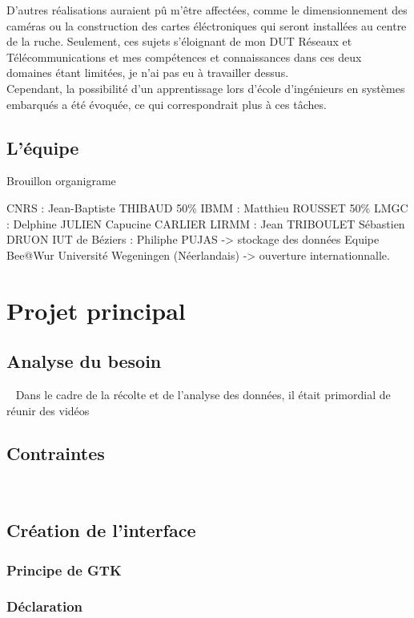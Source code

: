 \documentclass[11pt, french]{report}
\begin{document}
D'autres réalisations auraient pû m'être affectées, comme le dimensionnement des caméras ou la construction des cartes éléctroniques
qui seront installées au centre de la ruche. Seulement, ces sujets s'éloignant de mon DUT Réseaux et Télécommunications et mes 
compétences et connaissances dans ces deux domaines étant limitées, je n'ai pas eu à travailler dessus.\\
Cependant, la possibilité d'un apprentissage lors d'école d'ingénieurs en systèmes embarqués a été évoquée, ce qui correspondrait 
plus à ces tâches.\\


\subsection{L'équipe}

Brouillon organigrame 

CNRS : Jean-Baptiste THIBAUD 50\%
IBMM : Matthieu ROUSSET 50\%
LMGC : Delphine JULIEN
       Capucine CARLIER
LIRMM : Jean TRIBOULET 
        Sébastien DRUON 
IUT de Béziers : Philiphe PUJAS -> stockage des données 
Equipe Bee@Wur Université Wegeningen (Néerlandais) -> ouverture internationnalle. 


\section{Projet principal}

    \subsection{Analyse du besoin} 
Dans le cadre de la récolte et de l'analyse des données, il était primordial de réunir des vidéos 

    \subsection{Contraintes} 
    \subsection{Création de l'interface}
        \subsubsection{Principe de GTK}
        \subsubsection{Déclaration}
\end{document}
